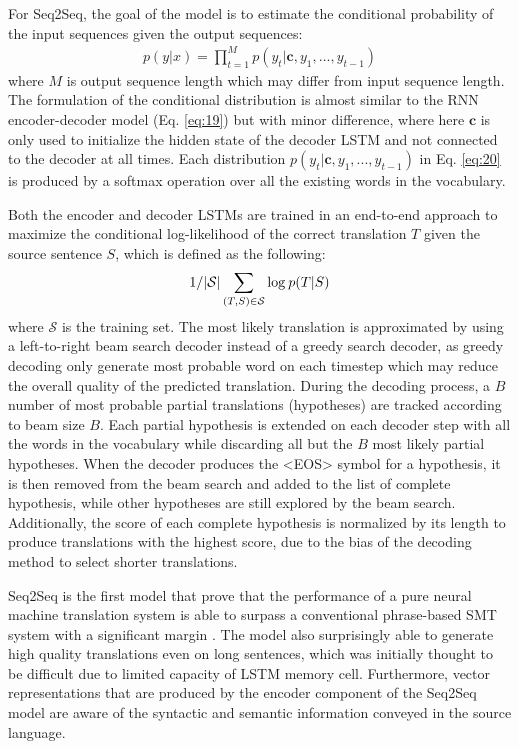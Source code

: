 \documentclass[12pt]{extarticle}
\begin{document}
For Seq2Seq, the goal of the model is to estimate the conditional probability of the input sequences given the output sequences:
\begin{align}
p(y|x) = \prod_{t=1}^{M} p(y_{t} | \textbf{c}, y_{1},..., y_{t-1})  \label{eq:20}
\end{align}
where $M$ is output sequence length which may differ from input sequence length. The formulation of the conditional distribution is almost similar to the RNN encoder-decoder model (Eq. \ref{eq:19}) but with minor difference, where here $\textbf{c}$ is only used to initialize the hidden state of the decoder LSTM and not connected to the decoder at all times. Each distribution $p(y_{t} | \textbf{c}, y_{1},..., y_{t-1})$ in Eq. \ref{eq:20} is produced by a softmax operation over all the existing words in the vocabulary.

Both the encoder and decoder LSTMs are trained in an end-to-end approach to maximize the conditional log-likelihood of the correct translation $T$ given the source sentence $S$, which is defined as the following:
\begin{align}
1/ |\mathcal{S}| \sum_{(T,S) \in \mathcal{S}} \textnormal{log}\: p(T|S)
\end{align}
where $\mathcal{S}$ is the training set. The most likely translation is approximated by using a left-to-right beam search decoder instead of a greedy search decoder, as greedy decoding only generate most probable word on each timestep which may reduce the overall quality of the predicted translation. During the decoding process, a $B$ number of most probable partial translations (hypotheses) are tracked according to beam size $B$. Each partial hypothesis is extended on each decoder step with all the words in the vocabulary while discarding all but the $B$ most likely partial hypotheses. When the decoder produces the \textless EOS\textgreater{} symbol for a hypothesis, it is then removed from the beam search and added to the list of complete hypothesis, while other hypotheses are still explored by the beam search. Additionally, the score of each complete hypothesis is normalized by its length to produce translations with the highest score, due to the bias of the decoding method to select shorter translations.

Seq2Seq is the first model that prove that the performance of a pure neural machine translation system is able to surpass a conventional phrase-based SMT system with a significant margin \citep{Sutskever:2014:SSL:2969033.2969173}. The model also surprisingly able to generate high quality translations even on long sentences, which was initially thought to be difficult due to limited capacity of LSTM memory cell. Furthermore, vector representations that are produced by the encoder component of the Seq2Seq model are aware of the syntactic and semantic information conveyed in the source language.  
\end{document}
